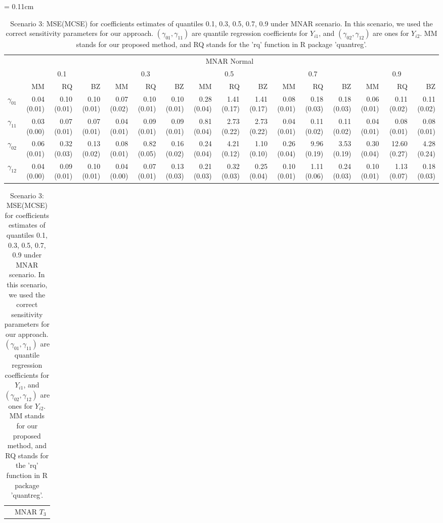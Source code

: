 \documentclass[12pt]{article}
\begin{document}
\begin{landscape}
  \begin{table}[h]
    \renewcommand{\arraystretch}{1.3}
    \scriptsize
    \centering
    \caption{Scenario 3: MSE(MCSE) for coefficients estimates of quantiles
      0.1, 0.3, 0.5, 0.7, 0.9 under MNAR scenario. In this scenario, we used the correct
      sensitivity parameters
      for our approach. $(\gamma_{01}, \gamma_{11})$
      are quantile regression coefficients for $Y_{i1}$, and $(\gamma_{02}, \gamma_{12})$
      are ones for $Y_{i2}$. MM stands for our proposed method, and RQ stands for the 'rq'
      function in R package 'quantreg'.} \label{tab:sim3}
    \vspace{10pt}
    \tabcolsep = 0.11cm
    \begin{tabular}{rrrrrrrrrrrrrrrr}
      \toprule
      & \multicolumn{15}{c}{MNAR Normal} \\
      \cline{2-16}
      &  \multicolumn{3}{c}{0.1} &  \multicolumn{3}{c}{0.3} &  \multicolumn{3}{c}{0.5} &
      \multicolumn{3}{c}{0.7} &  \multicolumn{3}{c}{0.9} \\
      \cline{2-16}
      & MM   & RQ   & BZ   & MM   & RQ   & BZ   & MM   & RQ   & BZ   & MM   & RQ   & BZ   & MM   & RQ   & BZ   \\
      \hline
      $\gamma_{01}$ & 0.04 (0.01) & 0.10 (0.01) & 0.10 (0.01) & 0.07 (0.02) & 0.10 (0.01) & 0.10 (0.01) & 0.28 (0.04) & 1.41 (0.17) & 1.41 (0.17) & 0.08 (0.01) & 0.18 (0.03) & 0.18 (0.03) & 0.06 (0.01) & 0.11 (0.02) & 0.11 (0.02) \\
      $\gamma_{11}$ & 0.03 (0.00) & 0.07 (0.01) & 0.07 (0.01) & 0.04 (0.01) & 0.09 (0.01) & 0.09 (0.01) & 0.81 (0.04) & 2.73 (0.22) & 2.73 (0.22) & 0.04 (0.01) & 0.11 (0.02) & 0.11 (0.02) & 0.04 (0.01) & 0.08 (0.01) & 0.08 (0.01) \\
      $\gamma_{02}$ & 0.06 (0.01) & 0.32 (0.03) & 0.13 (0.02) & 0.08 (0.01) & 0.82 (0.05) & 0.16 (0.02) & 0.24 (0.04) & 4.21 (0.12) & 1.10 (0.10) & 0.26 (0.04) & 9.96 (0.19) & 3.53 (0.19) & 0.30 (0.04) & 12.60 (0.27) & 4.28 (0.24) \\
      $\gamma_{12}$ & 0.04 (0.00) & 0.09 (0.01) & 0.10 (0.01) & 0.04 (0.00) & 0.07 (0.01) & 0.13 (0.03) & 0.21 (0.03) & 0.32 (0.03) & 0.25 (0.04) & 0.10 (0.01) & 1.11 (0.06) & 0.24 (0.03) & 0.10 (0.01) & 1.13 (0.07) & 0.18 (0.03) \\
      \bottomrule
    \end{tabular}
    \begin{tabular}{rrrrrrrrrrrrrrrr}
      \toprule
      & \multicolumn{15}{c}{MNAR $T_3$} \\

\end{tabular}
\end{table}
\end{landscape}
\end{document}
